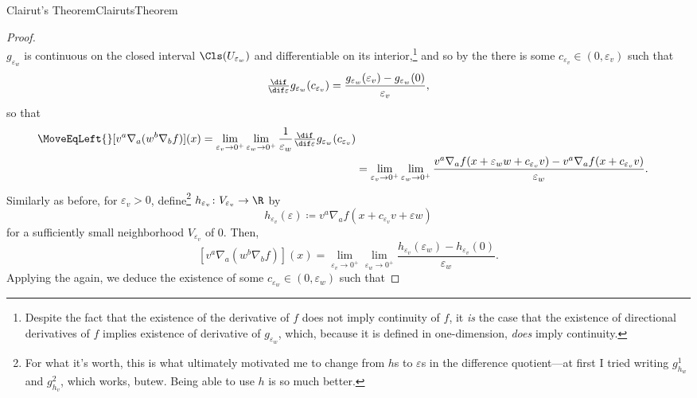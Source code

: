 \begin{thm}{Clairut's Theorem}{ClairutsTheorem}
\begin{proof}
\begin{equation}
\end{equation}
$g_{\varepsilon _w}$ is continuous on the closed interval $\Cls (U_{\varepsilon _w})$ and differentiable on its interior,\footnote{Despite the fact that the existence of the derivative of $f$ does not imply continuity of $f$, it \emph{is} the case that the existence of directional derivatives of $f$ implies existence of derivative of $g_{\varepsilon _w}$, which, because it is defined in one-dimension, \emph{does} imply continuity.} and so by the  there is some $c_{\varepsilon _v}\in (0,\varepsilon _v)$ such that
\begin{equation}
\tfrac{\dif}{\dif \varepsilon}g_{\varepsilon _w}(c_{\varepsilon _v})=\frac{g_{\varepsilon _w}(\varepsilon _v)-g_{\varepsilon _w}(0)}{\varepsilon _v},
\end{equation}
so that
{\small
\begin{equation}
\begin{split}
\MoveEqLeft {}
[v^a\nabla _a(w^b\nabla _bf)](x)=\lim _{\varepsilon _v\to 0^+}\lim _{\varepsilon _w\to 0^+}\frac{1}{\varepsilon _w}\tfrac{\dif}{\dif \varepsilon}g_{\varepsilon _w}(c_{\varepsilon _v}) \\
& =\lim _{\varepsilon _v\to 0^+}\lim _{\varepsilon _w\to 0^+}\frac{v^a\nabla _af(x+\varepsilon _ww+c_{\varepsilon _v}v)-v^a\nabla _af(x+c_{\varepsilon _v}v)}{\varepsilon _w}.
\end{split}
\end{equation}
}
Similarly as before, for $\varepsilon _v>0$, define\footnote{For what it's worth, this is what ultimately motivated me to change from $h$s to $\varepsilon$s in the difference quotient---at first I tried writing $g_{h_w}^1$ and $g_{h_v}^2$, which works, but\textellipsis ew.  Being able to use $h$ is so much better.} $h_{\varepsilon _v}\colon V_{\varepsilon _v}\rightarrow \R$ by
\begin{equation}
h_{\varepsilon _v}(\varepsilon )\coloneqq v^a\nabla _af(x+c_{\varepsilon _v}v+\varepsilon w)
\end{equation}
for a sufficiently small neighborhood $V_{\varepsilon _v}$ of $0$.  Then,
\begin{equation}
\left[ v^a\nabla _a(w^b\nabla _bf)\right] (x)=\lim _{\varepsilon _v\to 0^+}\lim _{\varepsilon _w\to 0^+}\frac{h_{\varepsilon _v}(\varepsilon _w)-h_{\varepsilon _v}(0)}{\varepsilon _w}.
\end{equation}
Applying the  again, we deduce the existence of some $c_{\varepsilon _w}\in (0,\varepsilon _w)$ such that 

\end{proof}
\end{thm}
